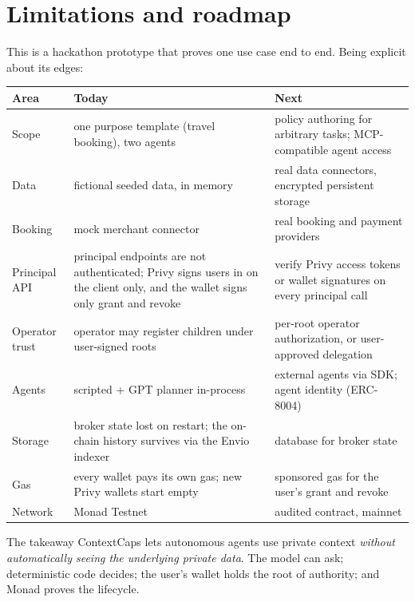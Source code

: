 \documentclass[11pt,a4paper]{article}
\begin{document}
\section{Limitations and roadmap}\label{sec:limits}

This is a hackathon prototype that proves one use case end to end. Being explicit about its edges:

\begin{center}
\renewcommand{\arraystretch}{1.35}
\small
\begin{tabularx}{\textwidth}{@{}l Y Y@{}}
\toprule
\textbf{Area} & \textbf{Today} & \textbf{Next}\\
\midrule
Scope & one purpose template (travel booking), two agents & policy authoring for arbitrary tasks; MCP-compatible agent access\\
Data & fictional seeded data, in memory & real data connectors, encrypted persistent storage\\
Booking & mock merchant connector & real booking and payment providers\\
Principal API & principal endpoints are not authenticated; Privy signs users in on the client only, and the wallet signs only grant and revoke & verify Privy access tokens or wallet signatures on every principal call\\
Operator trust & operator may register children under user-signed roots & per-root operator authorization, or user-approved delegation\\
Agents & scripted + GPT planner in-process & external agents via SDK; agent identity (ERC-8004)\\
Storage & broker state lost on restart; the on-chain history survives via the Envio indexer & database for broker state\\
Gas & every wallet pays its own gas; new Privy wallets start empty & sponsored gas for the user's grant and revoke\\
Network & Monad Testnet & audited contract, mainnet\\
\bottomrule
\end{tabularx}
\end{center}

\vspace{1em}
\begin{keyidea}{The takeaway}
ContextCaps lets autonomous agents use private context \emph{without automatically seeing the underlying private data}. The model can ask; deterministic code decides; the user's wallet holds the root of authority; and Monad proves the lifecycle.
\end{keyidea}
\end{document}
